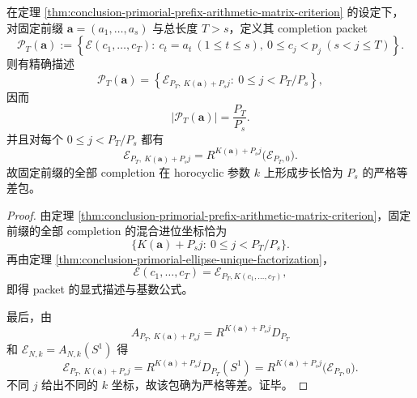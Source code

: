 \begin{corollary}\label{cor:conclusion-primorial-completion-horocyclic-packet}
在定理 \ref{thm:conclusion-primorial-prefix-arithmetic-matrix-criterion} 的设定下，对固定前缀 \(\mathbf a=(a_1,\dots,a_s)\) 与总长度 \(T>s\)，定义其 completion packet
\[
\mathscr P_T(\mathbf a):=
\left\{
\mathcal E(c_1,\dots,c_T):
\ c_t=a_t\ (1\le t\le s),\ 0\le c_j<p_j\ (s<j\le T)
\right\}.
\]
则有精确描述
\[
\mathscr P_T(\mathbf a)
=
\left\{
\mathcal E_{P_T,\ K(\mathbf a)+P_sj}:\ 0\le j<P_T/P_s
\right\},
\]
因而
\[
|\mathscr P_T(\mathbf a)|=\frac{P_T}{P_s}.
\]
并且对每个 \(0\le j<P_T/P_s\) 都有
\[
\mathcal E_{P_T,\ K(\mathbf a)+P_sj}
=
R^{K(\mathbf a)+P_sj}\bigl(\mathcal E_{P_T,0}\bigr).
\]
故固定前缀的全部 completion 在 horocyclic 参数 \(k\) 上形成步长恰为 \(P_s\) 的严格等差包。
\end{corollary}
\begin{proof}
由定理 \ref{thm:conclusion-primorial-prefix-arithmetic-matrix-criterion}，固定前缀的全部 completion 的混合进位坐标恰为
\[
\{K(\mathbf a)+P_sj:\ 0\le j<P_T/P_s\}.
\]
再由定理 \ref{thm:conclusion-primorial-ellipse-unique-factorization}，
\[
\mathcal E(c_1,\dots,c_T)=\mathcal E_{P_T,K(c_1,\dots,c_T)},
\]
即得 packet 的显式描述与基数公式。

最后，由
\[
A_{P_T,\ K(\mathbf a)+P_sj}=R^{K(\mathbf a)+P_sj}D_{P_T}
\]
和 \(\mathcal E_{N,k}=A_{N,k}(S^1)\) 得
\[
\mathcal E_{P_T,\ K(\mathbf a)+P_sj}
=
R^{K(\mathbf a)+P_sj}D_{P_T}(S^1)
=
R^{K(\mathbf a)+P_sj}\bigl(\mathcal E_{P_T,0}\bigr).
\]
不同 \(j\) 给出不同的 \(k\) 坐标，故该包确为严格等差。证毕。
\end{proof}

